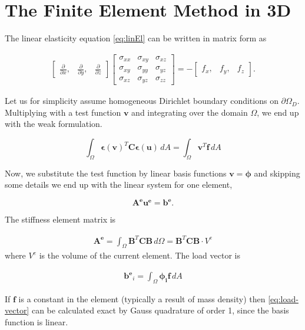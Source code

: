 \section{The Finite Element Method in 3D}

The linear elasticity equation \eqref{eq:linEl} can be written in matrix form as

\begin{align*}
\begin{bmatrix}
\frac{\partial}{\partial x}, & \frac{\partial}{\partial y}, & \frac{\partial}{\partial z}
\end{bmatrix}
\begin{bmatrix}
\sigma_{xx} & \sigma_{xy} & \sigma_{xz} \\
\sigma_{xy} & \sigma_{yy} & \sigma_{yz} \\
\sigma_{xz} & \sigma_{yz} & \sigma_{zz}
\end{bmatrix} = -
\begin{bmatrix}
f_x, & f_y, & f_z 
\end{bmatrix}.
\end{align*}

Let us for simplicity assume homogeneous Dirichlet boundary conditions on $\partial \Omega_D$. Multiplying with a test function $\bm{v}$ and integrating over the domain $\Omega$, we end up with the weak formulation. 

\begin{equation}
\int_\Omega \bm{\epsilon}(\bm{v})^T \bm{C} \bm{\epsilon}(\bm{u}) \, dA = \int_\Omega \bm{v}^T \bm{f} \, dA
\end{equation}

Now, we substitute the test function by linear basis functions $\bm{v} = \bm{\phi}$ and skipping some details we end up with the linear system for one element,

\begin{equation}
\label{eq:linear-system}
\bm{A^e} \bm{u^e} = \bm{b^e}.
\end{equation}

The stiffness element matrix is

\begin{align}
\bm{A^e} = \int_\Omega \bm{B}^T \bm{C} \bm{B} \, d\Omega = \bm{B}^T \bm{C} \bm{B} \cdot V^e
\end{align}
where $V^e$ is the volume of the current element. The load vector is

\begin{align}
\label{eq:load-vector}
\bm{b^e}_i = 
\int_{\Omega} \bm{\phi_i} \bm{f} \, dA 
\end{align}

If $\bm{f}$ is a constant in the element (typically a result of mass density) then \eqref{eq:load-vector} can be calculated exact by Gauss quadrature of order 1, since the basis function is linear. 